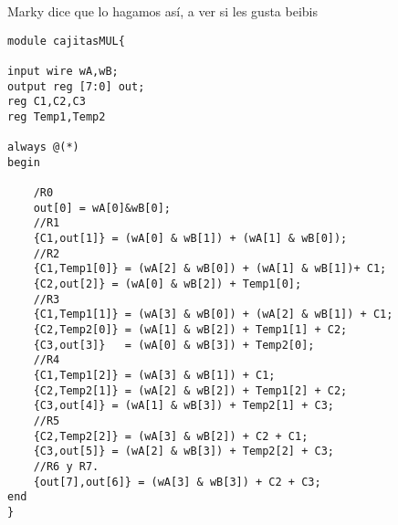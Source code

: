 \documentclass[letterpaper]{article}
\begin{document}
Marky dice que lo hagamos así, a ver si les gusta beibis

\begin{lstlisting}
module cajitasMUL{

input wire wA,wB;
output reg [7:0] out;
reg C1,C2,C3
reg Temp1,Temp2

always @(*)
begin

	/R0
	out[0] = wA[0]&wB[0];
	//R1
	{C1,out[1]} = (wA[0] & wB[1]) + (wA[1] & wB[0]);
	//R2
	{C1,Temp1[0]} = (wA[2] & wB[0]) + (wA[1] & wB[1])+ C1;
	{C2,out[2]} = (wA[0] & wB[2]) + Temp1[0];
	//R3
	{C1,Temp1[1]} = (wA[3] & wB[0]) + (wA[2] & wB[1]) + C1;
	{C2,Temp2[0]} = (wA[1] & wB[2]) + Temp1[1] + C2;
	{C3,out[3]}   = (wA[0] & wB[3]) + Temp2[0];
	//R4
	{C1,Temp1[2]} = (wA[3] & wB[1]) + C1;
	{C2,Temp2[1]} = (wA[2] & wB[2]) + Temp1[2] + C2;
	{C3,out[4]} = (wA[1] & wB[3]) + Temp2[1] + C3;
	//R5
	{C2,Temp2[2]} = (wA[3] & wB[2]) + C2 + C1;
	{C3,out[5]} = (wA[2] & wB[3]) + Temp2[2] + C3;
	//R6 y R7.
	{out[7],out[6]} = (wA[3] & wB[3]) + C2 + C3; 
end
}
\end{lstlisting}
\end{document}
